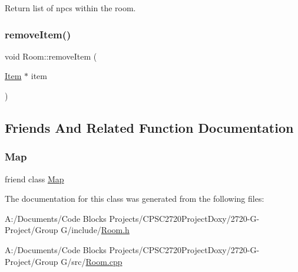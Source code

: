 Return list of npcs within the room. 

\mbox{\label{class_room_a1d24e0d3f909e101b6a884ccab081a52}} 
\subsubsection{\texorpdfstring{remove\+Item()}{removeItem()}}
{\footnotesize\ttfamily void Room\+::remove\+Item (\begin{DoxyParamCaption}\item[{\mbox{\hyperlink{class_item}{Item}} $\ast$}]{item }\end{DoxyParamCaption})}



\subsection{Friends And Related Function Documentation}
\mbox{\label{class_room_ad2f32e921244459f7cc6d50355429cc6}} 
\subsubsection{\texorpdfstring{Map}{Map}}
{\footnotesize\ttfamily friend class \mbox{\hyperlink{class_map}{Map}}\hspace{0.3cm}{\ttfamily [friend]}}



The documentation for this class was generated from the following files\+:\begin{DoxyCompactItemize}
\item 
A\+:/\+Documents/\+Code Blocks Projects/\+C\+P\+S\+C2720\+Project\+Doxy/2720-\/\+G-\/\+Project/\+Group G/include/\mbox{\hyperlink{_room_8h}{Room.\+h}}\item 
A\+:/\+Documents/\+Code Blocks Projects/\+C\+P\+S\+C2720\+Project\+Doxy/2720-\/\+G-\/\+Project/\+Group G/src/\mbox{\hyperlink{_room_8cpp}{Room.\+cpp}}\end{DoxyCompactItemize}
